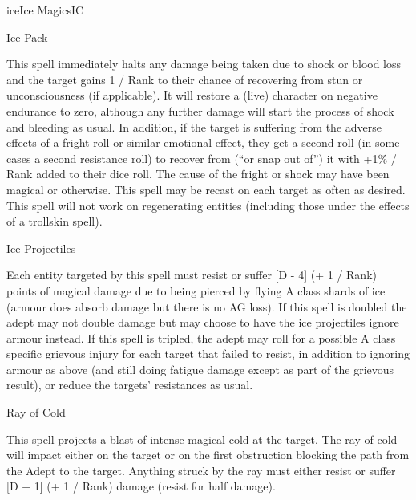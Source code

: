 \begin{College}[1.5]{ice}{Ice Magics}{IC}
\begin{spell}[S-10]{Ice Pack}
\begin{effects}
This spell immediately halts any damage being taken due to shock or
blood loss and the target gains 1 / Rank to their chance of recovering
from stun or unconsciousness (if applicable). It will restore a (live)
character on negative endurance to zero, although any further damage
will start the process of shock and bleeding as usual. In addition, if
the target is suffering from the adverse effects of a fright roll or
similar emotional effect, they get a second roll (in some cases a
second resistance roll) to recover from (“or snap out of”) it with
+1\% / Rank added to their dice roll.  The cause of the fright or
shock may have been magical or otherwise.  This spell may be recast
on each target as often as desired. This spell will not work on
regenerating entities (including those under the effects of a
trollskin spell).
\end{effects}
\end{spell}

\begin{spell}[S-11]{Ice Projectiles}

\begin{effects}
Each entity targeted by this spell must resist or suffer [D - 4] (+ 1
/ Rank) points of magical damage due to being pierced by flying A
class shards of ice (armour does absorb damage but there is no AG
loss).  If this spell is doubled the adept may not double damage but
may choose to have the ice projectiles ignore armour instead.  If this
spell is tripled, the adept may roll for a possible A class specific
grievous injury for each target that failed to resist, in addition to
ignoring armour as above (and still doing fatigue damage except as
part of the grievous result), or reduce the targets’ resistances as
usual.
\end{effects}
\end{spell}

\begin{spell}[S-12]{Ray of Cold}
\begin{effects}
This spell projects a blast of intense magical cold at the target.
The ray of cold will impact either on the target or on the first
obstruction blocking the path from the Adept to the target.  Anything
struck by the ray must either resist or suffer [D + 1] (+ 1 / Rank)
damage (resist for half damage).
\end{effects}
\end{spell}


\end{College}
